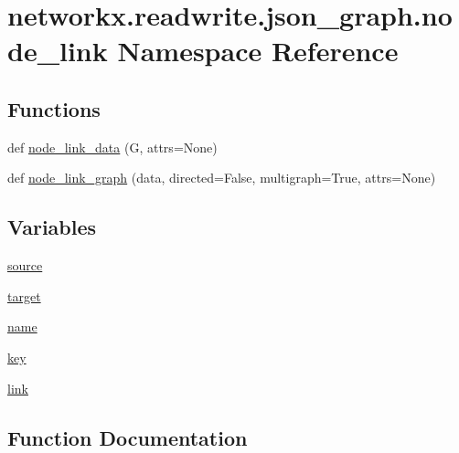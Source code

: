 \hypertarget{namespacenetworkx_1_1readwrite_1_1json__graph_1_1node__link}{}\section{networkx.\+readwrite.\+json\+\_\+graph.\+node\+\_\+link Namespace Reference}
\label{namespacenetworkx_1_1readwrite_1_1json__graph_1_1node__link}
\subsection*{Functions}
\begin{DoxyCompactItemize}
\item 
def \hyperlink{namespacenetworkx_1_1readwrite_1_1json__graph_1_1node__link_a6dddc87ccc630fe3ad6138983ad1c104}{node\+\_\+link\+\_\+data} (G, attrs=None)
\item 
def \hyperlink{namespacenetworkx_1_1readwrite_1_1json__graph_1_1node__link_a3afa2ab08fa08b84be93a597b78a306b}{node\+\_\+link\+\_\+graph} (data, directed=False, multigraph=True, attrs=None)
\end{DoxyCompactItemize}
\subsection*{Variables}
\begin{DoxyCompactItemize}
\item 
\hyperlink{namespacenetworkx_1_1readwrite_1_1json__graph_1_1node__link_af3d9612f4911f15a5eb87b708d58239d}{source}
\item 
\hyperlink{namespacenetworkx_1_1readwrite_1_1json__graph_1_1node__link_a7c79ceda904b7d339eafa76529539622}{target}
\item 
\hyperlink{namespacenetworkx_1_1readwrite_1_1json__graph_1_1node__link_aa4902f5534fdd51191b3f6b84e5c032a}{name}
\item 
\hyperlink{namespacenetworkx_1_1readwrite_1_1json__graph_1_1node__link_a2fd1ba094fcb4f8118f87826eb942768}{key}
\item 
\hyperlink{namespacenetworkx_1_1readwrite_1_1json__graph_1_1node__link_ad5ccfbdf80c0170775bdca3015710abe}{link}
\end{DoxyCompactItemize}


\subsection{Function Documentation}
\mbox{\label{namespacenetworkx_1_1readwrite_1_1json__graph_1_1node__link_a6dddc87ccc630fe3ad6138983ad1c104}} 
